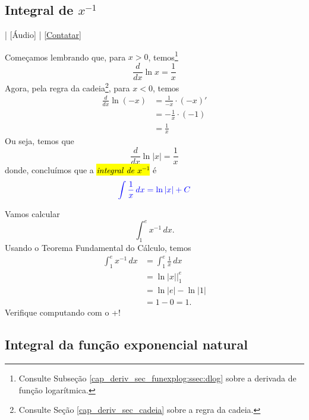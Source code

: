 \subsection{Integral de $x^{-1}$}

\begin{flushright}
  [Vídeo] | [Áudio] | \href{https://phkonzen.github.io/notas/contato.html}{[Contatar]}
\end{flushright}

Começamos lembrando que, para $x>0$, temos\footnote{Consulte Subseção \ref{cap_deriv_sec_funexplog:ssec:dlog} sobre a derivada de função logarítmica.}
\begin{equation}
  \frac{d}{dx}\ln x = \frac{1}{x}
\end{equation}
Agora, pela regra da cadeia\footnote{Consulte Seção \ref{cap_deriv_sec_cadeia} sobre a regra da cadeia.}, para $x<0$, temos
\begin{align}
  \frac{d}{dx}\ln(-x) &= \frac{1}{-x}\cdot (-x)'\\
                      &= -\frac{1}{x}\cdot (-1)\\
                      &= \frac{1}{x}
\end{align}
Ou seja, temos que 
\begin{equation}
  \frac{d}{dx}\ln|x| = \frac{1}{x}
\end{equation}
donde, concluímos que a \hl{\emph{integral de $x^{-1}$}} é
\begin{equation}\color{blue}\int\frac{1}{x}\,dx = \ln|x| + C
\end{equation}

\begin{ex}
  Vamos calcular
  \begin{equation}
    \int_1^e x^{-1}\,dx.
  \end{equation}
  Usando o Teorema Fundamental do Cálculo, temos
  \begin{align}
    \int_1^e x^{-1}\,dx &= \int_1^e \frac{1}{x}\,dx\\
                        &= \left. \ln|x|\right|_1^e \\
                             &= \ln|e| - \ln|1| \\
                             &= 1 - 0 = 1.
  \end{align}
  \ifispython
  Verifique computando com o {\python}+{\sympy}!
  \fi
\end{ex}

\subsection{Integral da função exponencial natural}\label{cap_int_subsec_funexp}

